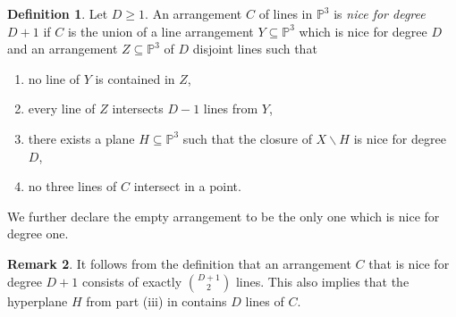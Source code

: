 \documentclass[a4paper,10pt]{amsart}
\theoremstyle{definition}
\newtheorem{Def}{Definition}[section]
\newtheorem{rem}[Def]{Remark}
\theoremstyle{plain}
\newcommand{\pp}{\mathbb{P}}
\begin{document}
\begin{Def}\label{def:nicearrangements}
    Let $D\geq1$. An arrangement $C$ of lines in $\pp^3$ is \emph{nice for degree $D+1$} if $C$ is the union of a line arrangement $Y\subseteq\pp^3$ which is nice for degree $D$ and an arrangement $Z\subseteq\pp^3$ of $D$ disjoint lines such that
    \begin{enumerate}
        \item no line of $Y$ is contained in $Z$,
        \item every line of $Z$ intersects $D-1$ lines from $Y$,
        \item there exists a plane $H\subseteq\pp^3$ such that the closure of $X\smallsetminus H$ is nice for degree $D$,
        \item no three lines of $C$ intersect in a point.
    \end{enumerate}
    We further declare the empty arrangement to be the only one which is nice for degree one.
\end{Def}

\begin{rem}\label{niceremarks}
    It follows from the definition that an arrangement $C$ that is nice for degree $D+1$ consists of exactly $\binom{D+1}{2}$ lines. This also implies that the hyperplane $H$ from part (iii) in  contains $D$ lines of $C$.
\end{rem}
\end{document}
